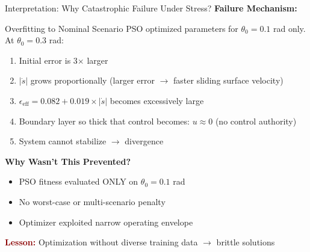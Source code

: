 \documentclass[10pt,aspectratio=169]{beamer}
\newcommand{\emphred}[1]{\textcolor{darkred}{\textbf{#1}}}
\begin{document}
\begin{frame}{Interpretation: Why Catastrophic Failure Under Stress?}
\textbf{Failure Mechanism:}

\begin{block}{Overfitting to Nominal Scenario}
PSO optimized parameters for $\theta_0 = 0.1$ rad only. At $\theta_0 = 0.3$ rad:
\begin{enumerate}
    \item Initial error is 3$\times$ larger
    \item $|\dot{s}|$ grows proportionally (larger error $\rightarrow$ faster sliding surface velocity)
    \item $\epsilon_{\text{eff}} = 0.082 + 0.019 \times |\dot{s}|$ becomes excessively large
    \item Boundary layer so thick that control becomes: $u \approx 0$ (no control authority)
    \item System cannot stabilize $\rightarrow$ divergence
\end{enumerate}
\end{block}

\vspace{0.3cm}
\textbf{Why Wasn't This Prevented?}
\begin{itemize}
    \item PSO fitness evaluated ONLY on $\theta_0 = 0.1$ rad
    \item No worst-case or multi-scenario penalty
    \item Optimizer exploited narrow operating envelope
\end{itemize}

\vspace{0.3cm}
\centering
\emphred{Lesson:} Optimization without diverse training data $\rightarrow$ brittle solutions
\end{frame}
\end{document}
